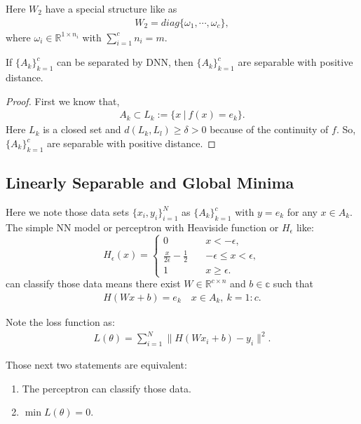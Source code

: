 \begin{remark}
Here $W_2$ have a special structure like as 
\begin{align}
W_2 = diag\{\omega_1, \cdots, \omega_c\},
\end{align}
where $\omega_i \in \mathbb{R}^{1\times n_i}$ with $\sum_{i=1}^c n_i = m$.
\end{remark}

\begin{theorem}
If $\{A_k\}_{k=1}^c$ can be separated by DNN, then $\{A_k\}_{k=1}^c$ are separable with positive distance. 
\end{theorem}
\begin{proof}First we know that,
\begin{align}
A_k \subset L_k := \{x ~|~ f(x) = e_k\}.
\end{align}
Here $L_k$ is a closed set and $d(L_k, L_l) \ge \delta > 0$ because of the continuity of $f$. So, 
$\{A_k\}_{k=1}^c$ are separable with positive distance.
\end{proof}

\subsection{Linearly Separable and Global Minima}

Here we note those data sets $\{x_i, y_i\}_{i=1}^N$ as $\{A_k\}_{k=1}^c$ with $y = e_k$ for any $x \in A_k$. The simple NN model or perceptron with Heaviside function or $H_{\epsilon}$ like:
\begin{equation}
H_{\epsilon}(x) = \begin{cases}
0 \quad & x < -\epsilon, \\
\frac{x}{2\epsilon} - \frac{1}{2} \quad & -\epsilon \le x < \epsilon, \\
1 \quad & x \ge \epsilon.
\end{cases}
\end{equation}
can classify those data means there exist $W \in \mathbb{R}^{c\times n}$ and $b \in \mathbb{c}$ such that 
\begin{align}
H(Wx + b) = e_k \quad x \in A_k, ~ k =1:c.
\end{align}

Note the loss function as:
\begin{align}
L(\theta) = \sum_{i=1}^N\|H(Wx_i + b) - y_i\|^2. 
\end{align}

\begin{properties}Those next two statements are equivalent:
\begin{enumerate}
\item The perceptron can classify those data.
\item $\min L(\theta) = 0$.
\end{enumerate}
\end{properties}


